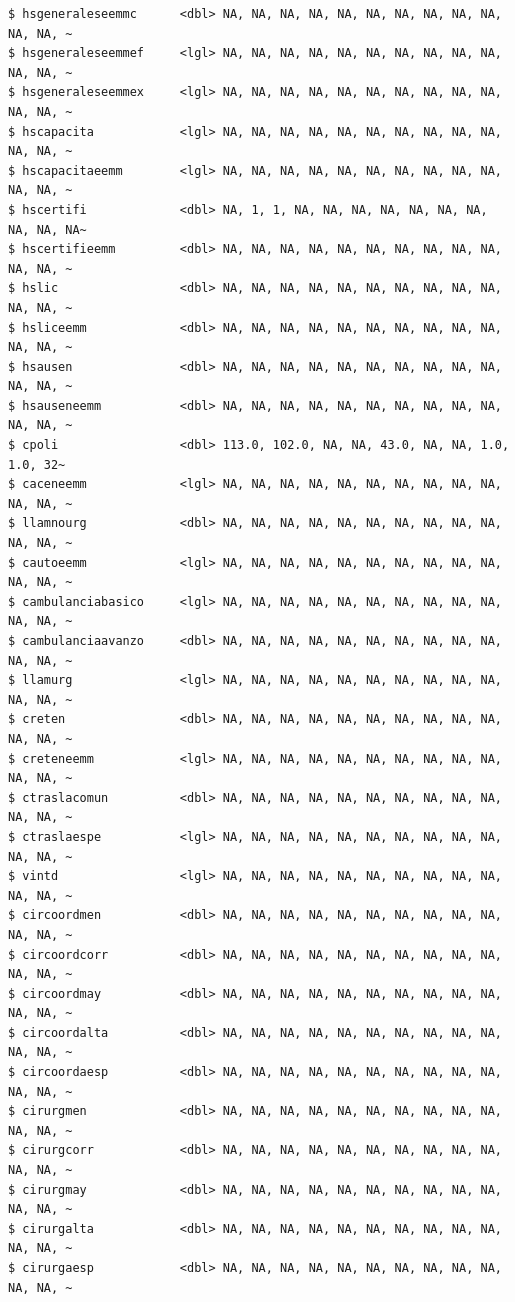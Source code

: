 \documentclass[
  letterpaper,
  DIV=11,
  numbers=noendperiod]{scrreprt}
\begin{document}
\begin{verbatim}
$ hsgeneraleseemmc      <dbl> NA, NA, NA, NA, NA, NA, NA, NA, NA, NA, NA, NA, ~
$ hsgeneraleseemmef     <lgl> NA, NA, NA, NA, NA, NA, NA, NA, NA, NA, NA, NA, ~
$ hsgeneraleseemmex     <lgl> NA, NA, NA, NA, NA, NA, NA, NA, NA, NA, NA, NA, ~
$ hscapacita            <lgl> NA, NA, NA, NA, NA, NA, NA, NA, NA, NA, NA, NA, ~
$ hscapacitaeemm        <lgl> NA, NA, NA, NA, NA, NA, NA, NA, NA, NA, NA, NA, ~
$ hscertifi             <dbl> NA, 1, 1, NA, NA, NA, NA, NA, NA, NA, NA, NA, NA~
$ hscertifieemm         <dbl> NA, NA, NA, NA, NA, NA, NA, NA, NA, NA, NA, NA, ~
$ hslic                 <dbl> NA, NA, NA, NA, NA, NA, NA, NA, NA, NA, NA, NA, ~
$ hsliceemm             <dbl> NA, NA, NA, NA, NA, NA, NA, NA, NA, NA, NA, NA, ~
$ hsausen               <dbl> NA, NA, NA, NA, NA, NA, NA, NA, NA, NA, NA, NA, ~
$ hsauseneemm           <dbl> NA, NA, NA, NA, NA, NA, NA, NA, NA, NA, NA, NA, ~
$ cpoli                 <dbl> 113.0, 102.0, NA, NA, 43.0, NA, NA, 1.0, 1.0, 32~
$ caceneemm             <lgl> NA, NA, NA, NA, NA, NA, NA, NA, NA, NA, NA, NA, ~
$ llamnourg             <dbl> NA, NA, NA, NA, NA, NA, NA, NA, NA, NA, NA, NA, ~
$ cautoeemm             <lgl> NA, NA, NA, NA, NA, NA, NA, NA, NA, NA, NA, NA, ~
$ cambulanciabasico     <lgl> NA, NA, NA, NA, NA, NA, NA, NA, NA, NA, NA, NA, ~
$ cambulanciaavanzo     <dbl> NA, NA, NA, NA, NA, NA, NA, NA, NA, NA, NA, NA, ~
$ llamurg               <lgl> NA, NA, NA, NA, NA, NA, NA, NA, NA, NA, NA, NA, ~
$ creten                <dbl> NA, NA, NA, NA, NA, NA, NA, NA, NA, NA, NA, NA, ~
$ creteneemm            <lgl> NA, NA, NA, NA, NA, NA, NA, NA, NA, NA, NA, NA, ~
$ ctraslacomun          <dbl> NA, NA, NA, NA, NA, NA, NA, NA, NA, NA, NA, NA, ~
$ ctraslaespe           <lgl> NA, NA, NA, NA, NA, NA, NA, NA, NA, NA, NA, NA, ~
$ vintd                 <lgl> NA, NA, NA, NA, NA, NA, NA, NA, NA, NA, NA, NA, ~
$ circoordmen           <dbl> NA, NA, NA, NA, NA, NA, NA, NA, NA, NA, NA, NA, ~
$ circoordcorr          <dbl> NA, NA, NA, NA, NA, NA, NA, NA, NA, NA, NA, NA, ~
$ circoordmay           <dbl> NA, NA, NA, NA, NA, NA, NA, NA, NA, NA, NA, NA, ~
$ circoordalta          <dbl> NA, NA, NA, NA, NA, NA, NA, NA, NA, NA, NA, NA, ~
$ circoordaesp          <dbl> NA, NA, NA, NA, NA, NA, NA, NA, NA, NA, NA, NA, ~
$ cirurgmen             <dbl> NA, NA, NA, NA, NA, NA, NA, NA, NA, NA, NA, NA, ~
$ cirurgcorr            <dbl> NA, NA, NA, NA, NA, NA, NA, NA, NA, NA, NA, NA, ~
$ cirurgmay             <dbl> NA, NA, NA, NA, NA, NA, NA, NA, NA, NA, NA, NA, ~
$ cirurgalta            <dbl> NA, NA, NA, NA, NA, NA, NA, NA, NA, NA, NA, NA, ~
$ cirurgaesp            <dbl> NA, NA, NA, NA, NA, NA, NA, NA, NA, NA, NA, NA, ~

\end{verbatim}
\end{document}
